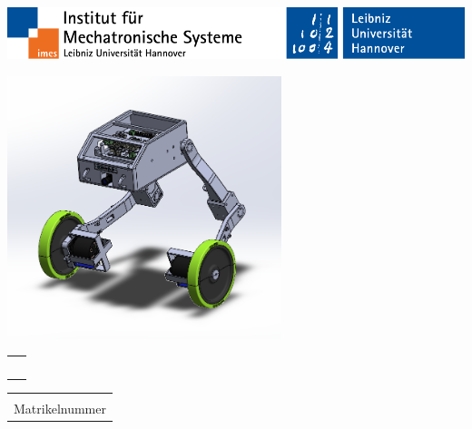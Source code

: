 %
\begin{titlepage}
	\begin{spacing}{2}
			
			\begin{flushright} %
					\vspace*{-20mm}
					\includegraphics[width=\textwidth]{Figures/title/CoverLogos.pdf}
				\end{flushright} %
			
			\vspace{38mm} {\centering {{\LARGE{\Titel}}} %
					
					\vfill
					\includegraphics[width = 80mm]{Figures/title/Capture.PNG}
					
					
					\vfill }
		\end{spacing}
	\begin{spacing}{1}
			\begin{tabular}{l}
					\Large{\ArtDerArbeit~\Kennnummer}
				\end{tabular}
			
			\vspace{5mm}
			
			\begin{tabular}{l}
					\large{\Autor}\\
					\large{Matrikelnummer \AutorMatrikelNr}
				\end{tabular}
			

\end{spacing}
\end{titlepage}
